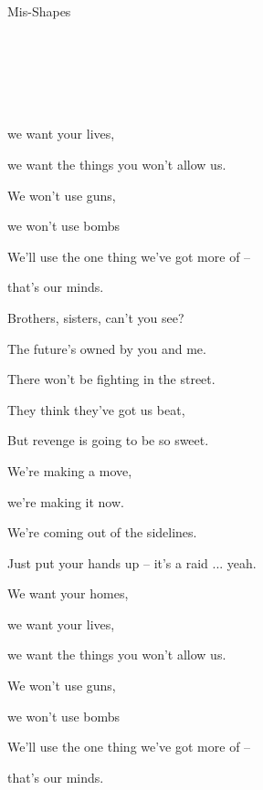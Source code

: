 \begin{song}{Mis-Shapes}{


	\mbox{ \AMaj \EMaj \Fshm \DMaj \DSeven}


	\mbox{ \GMaj \GMajSeven \GSeven \CMaj \CMajSeven \CSeven }
	

	\mbox{ \Em \EmSix \EmaddC }

}
\begin{SongVerse}
		we want your lives,

		we want the things you won't allow us. 

		We won't use guns, 

		we won't use bombs

		We'll use the one thing we've got more of --

		that's our minds.  \hspace{30pt}  \qquad {}

	\end{SongVerse}

	\begin{SongVerse}
				Brothers, sisters, can't you see? 

		The future's owned by you and me. 

		There won't be fighting in the street. 

		They think they've got us beat, 

		But revenge is going to be so sweet. 
	\end{SongVerse}

	\begin{SongVerse}		

		
		 \quad We're making a move, 

		we're making it now. 

		We're coming out of the sidelines. 

		\quad Just put your hands up -- it's a raid ... yeah.

		We want your homes,

		we want your lives,

		we want the things you won't allow us. 

		We won't use guns, 

		we won't use bombs

		We'll use the one thing we've got more of --

		that's our minds.  \hspace{30pt}  \qquad \ch{Em}

	 \end{SongVerse}

\end{song}